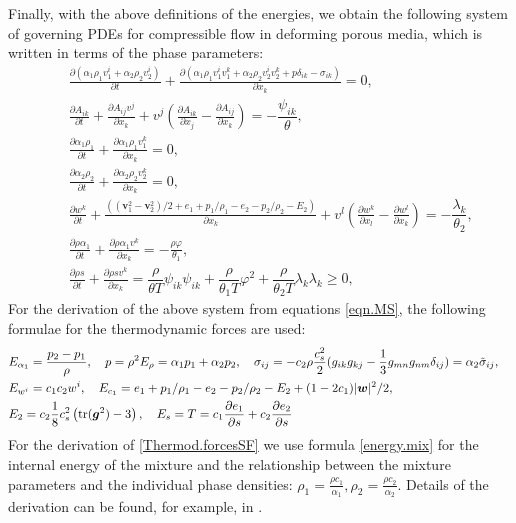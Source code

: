 \documentclass[3p,times,table]{article}
\renewcommand{\ggg}{{\bm{g}}}
\newcommand{\vv}{{\bm{v}}}
\newcommand{\ww}{{\bm{w}}}
\newcommand{\tr}{\textnormal{tr}}
\begin{document}
Finally, with the above definitions of the energies, we obtain the 
following system of governing PDEs for compressible flow in deforming 
porous media, which is written in terms of the phase parameters:
\begin{subequations}\label{eqn.PV}
	\begin{eqnarray}
&&\displaystyle\frac{\partial 
(\alpha_1\rho_1v^i_1+\alpha_2\rho_2v^i_2)}{\partial t}+
\frac{\partial(\alpha_1\rho_1v^i_1v^k_1+\alpha_2\rho_2v^i_2v^k_2 
+p\delta_{ik}-\sigma_{ik})}{\partial x_k}=0, 
\label{eqn.momentumPV}\\[2mm]
&&\displaystyle\frac{\partial A_{i k}}{\partial t}+\frac{\partial A_{ij} 
	v^j}{\partial x_k}+v^j\left(\frac{\partial A_{ik}}{\partial 
	x_j}-\frac{\partial A_{ij}}{\partial x_k}\right)
=-\dfrac{ \psi_{ik} }{\theta},\label{eqn.deformationPV}\\[2mm]
&& \frac{\partial \alpha_1\rho_1}{\partial t}+\frac{\partial \alpha_1\rho_1 
v^k_1}{\partial 
	x_k}=0,\label{eqn.contiPV1}\\[2mm]
&& \frac{\partial \alpha_2\rho_2}{\partial t}+\frac{\partial \alpha_2\rho_2 
v^k_2}{\partial 
	x_k}=0,\label{eqn.contiPV2}\\[2mm]
&&\displaystyle\frac{\partial w^k}{\partial 
t}+\frac{((\vv_1^2-\vv_2^2)/2+e_1+p_1/\rho_1-e_2-p_2/\rho_2-E_2)}{\partial 
x_k}
+v^l\left(\frac{\partial w^k}{\partial x_l}-
\frac{\partial w^l}{\partial x_k}\right)
=-\dfrac{ \lambda_{k}
}{\theta_2}, \label{eqn.relvelPV}\\[2mm]
&& \frac{\partial \rho \alpha_1}{\partial t}+\frac{\partial \rho \alpha_1 v^k 
}{\partial 
	x_k}=-\frac{\rho \varphi}{\theta_1},\label{eqn.alphaPV}\\[2mm]
&&\displaystyle\frac{\partial \rho s}{\partial t}+\frac{\partial \rho 
	s v^k }{\partial x_k}=\dfrac{\rho}{\theta T}\psi_{ik} \psi_{ik}+
\dfrac{\rho}{\theta_1 T}\varphi^2 +
\dfrac{\rho}{\theta_2 T}\lambda_k \lambda_k \geq0, 
\label{eqn.entropyPV}
\end{eqnarray}
\end{subequations}
For the derivation of the above system from equations \eqref{eqn.MS}, the following 
formulae for the thermodynamic forces are used:
\begin{eqnarray} \label{Thermod.forcesSF}
& E_{\alpha_1}=\frac{p_2-p_1}{\rho}, \quad p=\rho^2E_\rho={\alpha_1p_1+\alpha_2p_2}, 
\quad \sigma_{ij}=-c_2 \rho \frac{c_s^2}{2}({g_{ik}g_{kj}-\frac{1}{3}g_{mn}g_{nm}\delta_{ij}})=
\alpha_2 \tilde \sigma_{ij}, 
\quad  \nonumber \\
&E_{w^i}=c_1c_2 w^i, \quad 
E_{c_1}=e_1+p_1/\rho_1-e_2-p_2/\rho_2-E_2+(1-2c_1)|\ww|^2/2, \\ 
&E_2=c_2 \frac{1}{8}c_s^2\left(\tr({\ggg^2})-3\right), \quad 
E_s=T=c_1\frac{\partial e_1}{\partial s}+c_2\frac{\partial e_2}{\partial s} 
\nonumber
\end{eqnarray}  
For the derivation of \eqref{Thermod.forcesSF} we use formula \eqref{energy.mix} for the internal energy of the mixture and the relationship between the mixture parameters and the individual phase densities: $\rho_1=\frac{\rho c_1}{\alpha_1}, \rho_2=\frac{\rho c_2}{\alpha_2}$.
Details of the derivation can be found, for example, in 
\cite{RomDrikToro2010,Romenski2016}. 
 
\end{document}
